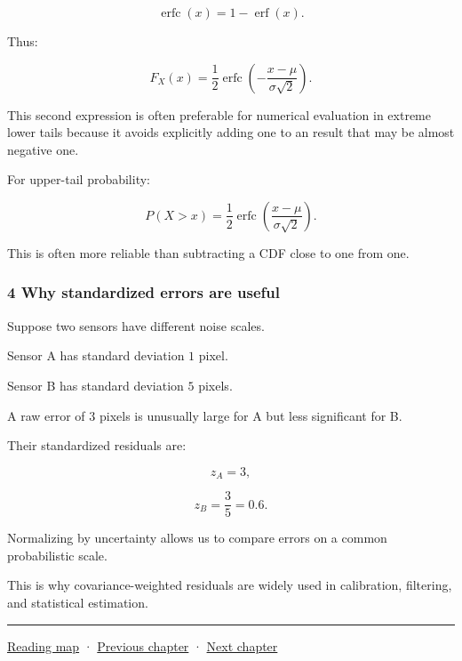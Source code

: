 \[
 \operatorname{erfc}(x)=1-\operatorname{erf}(x).
\]

Thus:

\[
 \boxed{ F_X(x) = \frac12\operatorname{erfc} \left( -\frac{x-\mu}{\sigma\sqrt2} \right) }.
\]

This second expression is often preferable for numerical evaluation in extreme lower tails because it avoids explicitly adding one to an  result that may be almost negative one.

For upper-tail probability:

\[
 P(X>x) = \frac12\operatorname{erfc} \left( \frac{x-\mu}{\sigma\sqrt2} \right).
\]

This is often more reliable than subtracting a CDF close to one from one.

\subsubsection{4 Why standardized errors are useful}\label{02-foundations-ii-ch023-why-standardized-errors-are-useful}

\hypertarget{02-foundations-ii-ch023-why-standardized-errors-are-useful}{}

Suppose two sensors have different noise scales.

Sensor A has standard deviation \(1\) pixel.

Sensor B has standard deviation \(5\) pixels.

A raw error of \(3\) pixels is unusually large for A but less significant for B.

Their standardized residuals are:

\[
 z_A=3,
\]

\[
 z_B=\frac35=0.6.
\]

Normalizing by uncertainty allows us to compare errors on a common probabilistic scale.

This is why covariance-weighted residuals are widely used in calibration, filtering, and statistical estimation.

\begin{center}\rule{0.5\linewidth}{0.5pt}\end{center}

\hyperref[volume-reading-map]{Reading map} · \hyperref[02-foundations-ii-ch022-accumulation-quadrature-and-the-bridge-to-probability]{Previous chapter} · \hyperref[02-foundations-ii-ch024-waiting-times-covariance-and-matrix-decomposition]{Next chapter}
